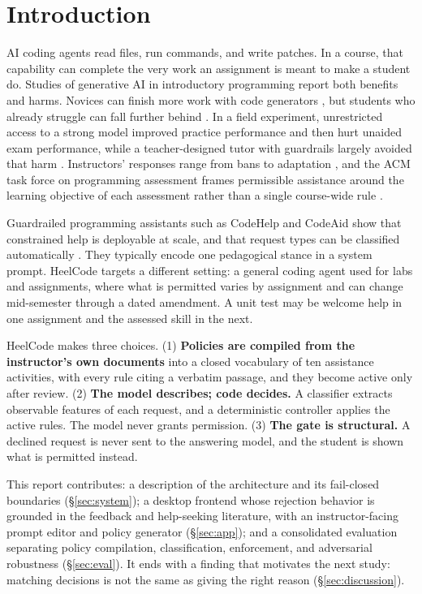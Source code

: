 \documentclass[11pt,letterpaper]{article}
\begin{document}
\section{Introduction}

AI coding agents read files, run commands, and write patches. In a course, that capability can complete the very work an assignment is meant to make a student do. Studies of generative AI in introductory programming report both benefits and harms. Novices can finish more work with code generators \citep{kazemitabaar2023}, but students who already struggle can fall further behind \citep{prather2024}. In a field experiment, unrestricted access to a strong model improved practice performance and then hurt unaided exam performance, while a teacher-designed tutor with guardrails largely avoided that harm \citep{bastani2025}. Instructors' responses range from bans to adaptation \citep{lau2023}, and the ACM task force on programming assessment frames permissible assistance around the learning objective of each assessment rather than a single course-wide rule \citep{gordon2026}.

Guardrailed programming assistants such as CodeHelp \citep{liffiton2023} and CodeAid \citep{codeaid2024} show that constrained help is deployable at scale, and that request types can be classified automatically \citep{savelkaclass2023}. They typically encode one pedagogical stance in a system prompt. HeelCode targets a different setting: a general coding agent used for labs and assignments, where what is permitted varies by assignment and can change mid-semester through a dated amendment. A unit test may be welcome help in one assignment and the assessed skill in the next.

HeelCode makes three choices. (1) \textbf{Policies are compiled from the instructor's own documents} into a closed vocabulary of ten assistance activities, with every rule citing a verbatim passage, and they become active only after review. (2) \textbf{The model describes; code decides.} A classifier extracts observable features of each request, and a deterministic controller applies the active rules. The model never grants permission. (3) \textbf{The gate is structural.} A declined request is never sent to the answering model, and the student is shown what is permitted instead.

This report contributes: a description of the architecture and its fail-closed boundaries (\S\ref{sec:system}); a desktop frontend whose rejection behavior is grounded in the feedback and help-seeking literature, with an instructor-facing prompt editor and policy generator (\S\ref{sec:app}); and a consolidated evaluation separating policy compilation, classification, enforcement, and adversarial robustness (\S\ref{sec:eval}). It ends with a finding that motivates the next study: matching decisions is not the same as giving the right reason (\S\ref{sec:discussion}).
\end{document}
